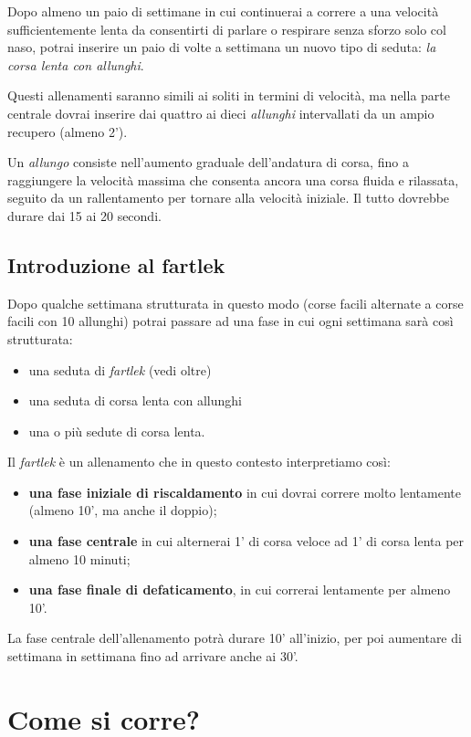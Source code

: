 Dopo almeno un paio di settimane in cui continuerai a correre
a una velocità sufficientemente lenta da consentirti di parlare o
respirare senza sforzo solo col naso,
potrai inserire un paio di volte a settimana un nuovo tipo di
seduta: \emph{la corsa lenta con allunghi}.

Questi allenamenti saranno simili ai soliti in termini di velocità,
ma nella parte centrale dovrai inserire dai quattro ai dieci \emph{allunghi}
intervallati da un ampio recupero (almeno 2').

Un \emph{allungo} consiste nell'aumento graduale dell'andatura di corsa,
fino a raggiungere la velocità massima che consenta ancora
una corsa fluida e rilassata, seguito da un rallentamento per tornare alla
velocità iniziale.
Il tutto dovrebbe durare dai 15 ai 20 secondi.

\section{Introduzione al fartlek}

Dopo qualche settimana strutturata in questo modo
(corse facili alternate a corse facili con 10 allunghi)
potrai passare ad una fase in cui ogni settimana sarà così strutturata:
\begin{itemize}
    \item una seduta di \emph{fartlek} (vedi oltre)
    \item una seduta di corsa lenta con allunghi
    \item una o più sedute di corsa lenta.
\end{itemize}
Il \emph{fartlek} è un allenamento che in questo contesto interpretiamo
così:
\begin{itemize}
    \item \textbf{una fase iniziale di riscaldamento} in cui dovrai correre molto lentamente
    (almeno 10', ma anche il doppio);
    \item \textbf{una fase centrale} in cui alternerai
    1' di corsa veloce ad 1' di corsa lenta per almeno 10 minuti;
    \item \textbf{una fase finale di defaticamento}, in cui correrai lentamente
    per almeno 10'.
\end{itemize}

La fase centrale dell'allenamento potrà durare 10' all'inizio,
per poi aumentare di settimana in settimana fino ad arrivare anche
ai 30'.


\chapter{Come si corre?}

